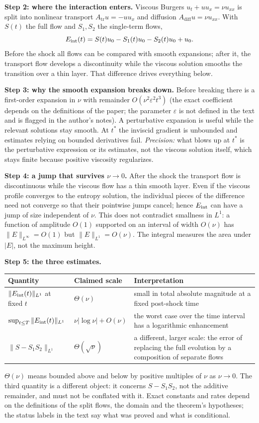 \medskip\textbf{Step 2: where the interaction enters.} Viscous Burgers $u_t+uu_x=\nu u_{xx}$ is split into nonlinear transport $A_{\mathrm{tr}}u=-uu_x$ and diffusion $A_{\mathrm{diff}}u=\nu u_{xx}$. With $S(t)$ the full flow and $S_1,S_2$ the single-term flows,
\[
E_{\mathrm{int}}(t)=S(t)u_0-S_1(t)u_0-S_2(t)u_0+u_0 .
\]
Before the shock all flows can be compared with smooth expansions; after it, the transport flow develops a discontinuity while the viscous solution smooths the transition over a thin layer. That difference drives everything below.

\medskip\textbf{Step 3: why the smooth expansion breaks down.} Before breaking there is a first-order expansion in $\nu$ with remainder $O(\nu^2\varepsilon^2t^3)$ (the exact coefficient depends on the definitions of the paper; the parameter $\varepsilon$ is not defined in the text and is flagged in the author's notes). A perturbative expansion is useful while the relevant solutions stay smooth. At $t^*$ the inviscid gradient is unbounded and estimates relying on bounded derivatives fail. \emph{Precision:} what blows up at $t^*$ is the perturbative expression or its estimates, not the viscous solution itself, which stays finite because positive viscosity regularizes.

\medskip\textbf{Step 4: a jump that survives $\nu\to0$.} After the shock the transport flow is discontinuous while the viscous flow has a thin smooth layer. Even if the viscous profile converges to the entropy solution, the individual pieces of the difference need not converge so that their pointwise jumps cancel; hence $E_{\mathrm{int}}$ can have a jump of size independent of $\nu$. This does not contradict smallness in $L^1$: a function of amplitude $O(1)$ supported on an interval of width $O(\nu)$ has $\|E\|_{L^\infty}=O(1)$ but $\|E\|_{L^1}=O(\nu)$. The integral measures the area under $|E|$, not the maximum height.

\medskip\textbf{Step 5: the three estimates.}
\begin{center}\small
\begin{tabular}{@{}L{4.3cm}L{3.0cm}L{6.6cm}@{}}
\toprule
Quantity & Claimed scale & Interpretation\\\midrule
$\|E_{\mathrm{int}}(t)\|_{L^1}$ at fixed $t$ & $\Theta(\nu)$ & small in total absolute magnitude at a fixed post-shock time\\
$\sup_{t\le T}\|E_{\mathrm{int}}(t)\|_{L^1}$ & $\nu|\log\nu|+O(\nu)$ & the worst case over the time interval has a logarithmic enhancement\\
$\|S-S_1S_2\|_{L^1}$ & $\Theta(\sqrt\nu)$ & a different, larger scale: the error of replacing the full evolution by a composition of separate flows\\
\bottomrule
\end{tabular}
\end{center}
$\Theta(\nu)$ means bounded above and below by positive multiples of $\nu$ as $\nu\to0$. The third quantity is a different object: it concerns $S-S_1S_2$, not the additive remainder, and must not be conflated with it. Exact constants and rates depend on the definitions of the split flows, the domain and the theorem's hypotheses; the status labels in the text say what was proved and what is conditional.

